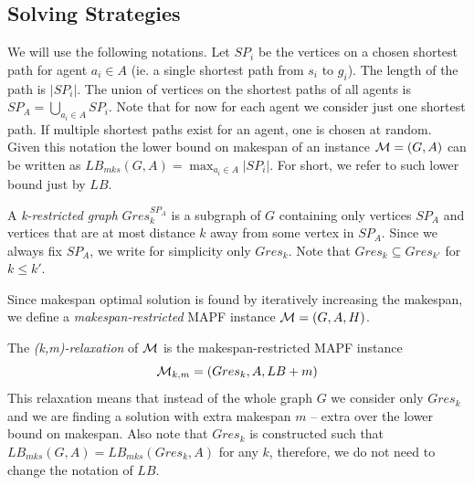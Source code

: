 
\subsection{Solving Strategies}


We will use the following notations. Let $SP_i$ be the vertices on a chosen shortest path for agent $a_i \in A$ (ie. a single shortest path from $s_i$ to $g_i$). The length of the path is $|SP_i|$. The union of vertices on the shortest paths of all agents is $SP_A = \bigcup_{a_i \in A} SP_i$. Note that for now for each agent we consider just one shortest path. If multiple shortest paths exist for an agent, one is chosen at random. Given this notation the lower bound on makespan of an instance $\mathcal{M} = (G,A)$ can be written as $LB_{mks}(G,A) = \max_{a_i \in A} |SP_i|$. For short, we refer to such lower bound just by $LB$.


A \emph{k-restricted graph} $Gres_{k}^{SP_A}$ is a subgraph of $G$ containing only vertices $SP_A$ and vertices that are at most distance $k$ away from some vertex in $SP_A$. %
Since we always fix $SP_A$, we write for simplicity only $Gres_k$. Note that $Gres_k \subseteq Gres_{k'}$ for $k \leq k'$. %

Since makespan optimal solution is found by iteratively increasing the makespan, we define a \emph{makespan-restricted} MAPF instance $\mathcal{M} = (G,A,H)$. %

The \emph{(k,m)-relaxation} of $\mathcal{M}$ is the makespan-restricted MAPF instance
\[
  {\mathcal{M}}_{k,m} = (Gres_k,A,LB+m)
\]
This relaxation means that instead of the whole graph $G$ we consider only $Gres_k$ and we are finding a solution with extra makespan $m$ -- extra over the lower bound on makespan. Also note that $Gres_k$ is constructed such that $LB_{mks}(G,A) = LB_{mks}(Gres_k,A)$ for any $k$, therefore, we do not need to change the notation of $LB$.

